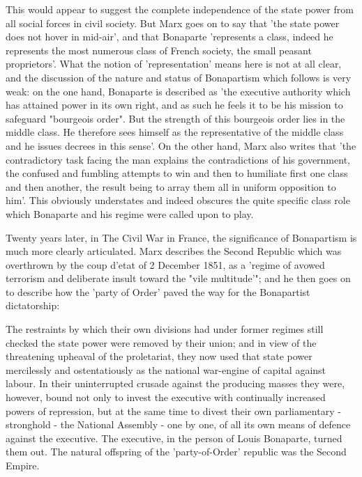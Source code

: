 This would appear to suggest the complete independence of the state power from all social forces in civil society. But Marx goes on to say that 'the state power does not hover in mid-air', and that Bonaparte 'represents a class, indeed he represents the most numerous class of French society, the small peasant proprietors'. What the notion of 'representation' means here is not at all clear, and the discussion of the nature and status of Bonapartism which follows is very weak: on the one hand, Bonaparte is described as 'the executive authority which has attained power in its own right, and as such he feels it to be his mission to safeguard "bourgeois order". But the strength of this bourgeois order lies in the middle class. He therefore sees himself as the representative of the middle class and he issues decrees in this sense'. On the other hand, Marx also writes that 'the contradictory task facing the man explains the contradictions of his government, the confused and fumbling attempts to win and then to humiliate first one class and then another, the result being to array them all in uniform opposition to him'. This obviously understates and indeed obscures the quite specific class role which Bonaparte and his regime were called upon to play.

Twenty years later, in The Civil War in France, the significance of Bonapartism is much more clearly articulated. Marx describes the Second Republic which was overthrown by the coup d'etat of 2 December 1851, as a 'regime of avowed terrorism and deliberate insult toward the "vile multitude'"; and he then goes on to describe how the 'party of Order' paved the way for the Bonapartist dictatorship:
\begin{displayquote}
    The restraints by which their own divisions had under former regimes still checked the state power were removed by their union; and in view of the threatening upheaval of the proletariat, they now used that state power mercilessly and ostentatiously as the national war-engine of capital against labour. In their uninterrupted crusade against the producing masses they were, however, bound not only to invest the executive with continually increased powers of repression, but at the same time to divest their own parliamentary -stronghold - the National Assembly - one by one, of all its own means of defence against the executive. The executive, in the person of Louis Bonaparte, turned them out. The natural offspring of the 'party-of-Order' republic was the Second Empire.
\end{displayquote}

